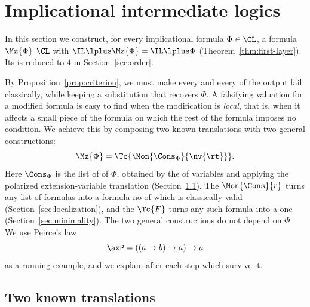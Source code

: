 \section{Implicational intermediate logics}\label{sec:implicational}

In this section we construct, for every implicational formula $\Phi\in\CL$,
a formula $\Mz{\Phi}$  $\CL$ with
$\IL\lplus\Mz{\Phi}=\IL\lplus\Phi$ (Theorem~\ref{thm:first-layer}). Its
 is reduced to $4$ in Section~\ref{sec:order}.

By Proposition~\ref{prop:criterion}, we must make every  and
every  of the output fail classically, while keeping a
substitution that recovers $\Phi$. A falsifying valuation for a modified
formula is easy to find when the modification is \emph{local}, that is,
when it affects a small  piece of the formula on which the
rest of the formula imposes no condition. We achieve this by composing two
known translations with two general constructions:
\[
\Mz{\Phi}=\Tc{\Mon{\Cons_\Phi}{\nv{\rt}}} .
\]
Here $\Cons_\Phi$ is the list of  of $\Phi$, obtained
by  the  of variables and applying the
polarized extension-variable translation (Section~\ref{sec:constraints}).
The  $\Mon{\Cons}{r}$ turns any list of  formulas
into a formula no  of which is classically valid
(Section~\ref{sec:localization}), and the  $\Tc{F}$ turns
any such formula into a  one (Section~\ref{sec:minimality}).
The two general constructions do not depend on $\Phi$. We use Peirce's law
\[
\axP=((a\to b)\to a)\to a
\]
as a running example, and we explain after each step which
 survive it.

\subsection{Two known translations}\label{sec:constraints}

